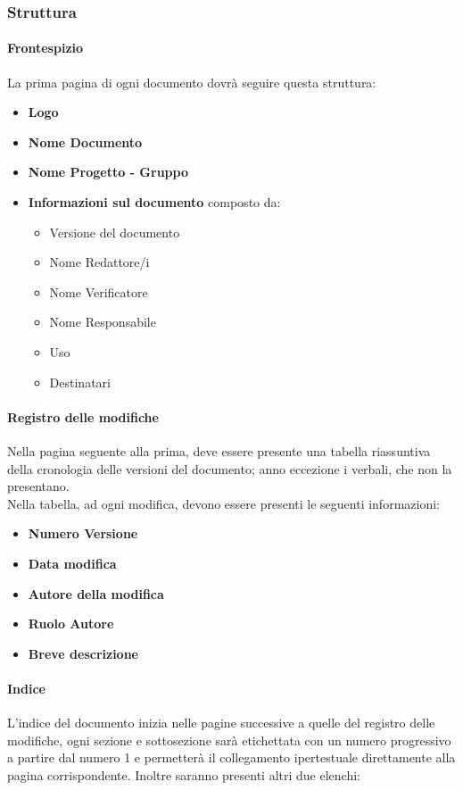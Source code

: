 \documentclass[11pt,a4paper]{article}
\begin{document}
{	\subsubsection{Struttura}
	
	\paragraph{Frontespizio} 
	La prima pagina di ogni documento dovrà seguire questa struttura:
	\begin{itemize}
		\item \textbf{Logo}
		\item \textbf{Nome Documento}
		\item \textbf{Nome Progetto - Gruppo}
		\item \textbf{Informazioni sul documento} composto da:
		\begin{itemize}
			\item  Versione del documento 
			\item Nome Redattore/i
			\item Nome Verificatore
			\item  Nome Responsabile
			\item  Uso
			\item Destinatari
		\end{itemize}
	\end{itemize}
	
	\paragraph{Registro delle modifiche\\}
	Nella pagina seguente alla prima, deve essere presente una tabella riassuntiva della cronologia delle versioni del documento; anno eccezione i verbali, che non la presentano. \\
	Nella tabella, ad ogni modifica, devono essere presenti le seguenti informazioni:
	
	\begin{itemize}
		\item \textbf{Numero Versione}
		\item \textbf{Data modifica}
		\item \textbf{Autore della modifica}
		\item \textbf{Ruolo Autore}
		\item \textbf{Breve descrizione}
	\end{itemize}
	
	\paragraph{Indice\\}
	L'indice del documento inizia nelle pagine successive a quelle del registro delle modifiche, ogni sezione e sottosezione sarà etichettata con un numero progressivo a partire dal numero 1 e permetterà il collegamento ipertestuale direttamente alla pagina corrispondente. Inoltre saranno presenti altri due elenchi:
	
}
\end{document}
